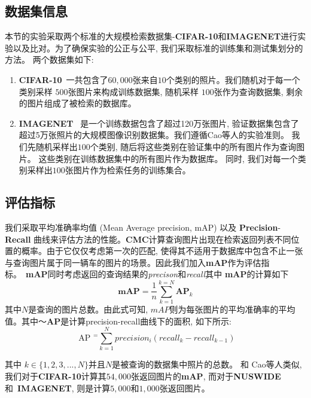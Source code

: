 \subsection{数据集信息}
本节的实验采取两个标准的大规模检索数据集-\textbf{CIFAR-10}和\textbf{IMAGENET}进行实验以及比对。为了确保实验的公正与公平, 我们采取标准的训练集和测试集划分的方法。 两个数据集如下:
\begin{enumerate}
    \item \textbf{CIFAR-10}~\cite{krizhevsky2009learning}一共包含了$60,000$张来自$10$个类别的照片。我们随机对于每一个类别采样 $500$张图片来构成训练数据集, 随机采样 $100$张作为查询数据集, 剩余的图片组成了被检索的数据库。 
    \item  \textbf{IMAGENET}~\cite{russakovsky2015imagenet} 是一个训练数据包含了超过120万张图片, 验证数据集包含了超过5万张照片的大规模图像识别数据集。我们遵循Cao等人的实验准则\cite{cao2017hashnet}。 我们先随机采样出$100$个类别, 随后将这些类别在验证集中的所有图片作为查询图片。 这些类别在训练数据集中的所有图片作为数据库。 同时, 我们对每一个类别采样出$100$张图片作为检索任务的训练集合。 
\end{enumerate}


\subsection{评估指标}
我们采取平均准确率均值 (Mean Average precision, mAP) 以及 \textbf{Precision}-\textbf{Recall}  曲线来评估方法的性能。\textbf{CMC}计算查询图片出现在检索返回列表不同位置的概率。由于它仅仅考虑第一次的匹配, 使得其不适用于数据库中包含不止一张与查询图片属于同一辆车的图片的场景。因此我们加入\textbf{mAP}作为评估指标。~\textbf{mAP}同时考虑返回的查询结果的\textit{precison}和\textit{recall}其中 \textbf{mAP}的计算如下
\begin{equation}
   \textbf{mAP} = \frac{1}{n} \sum_{k=1}^{k= N} \textbf{AP}_k
\end{equation}
其中$N$是查询的图片总数。由此式可知, $mAP$则为每张图片的平均准确率的平均值。其中～\textbf{AP}是计算precision-recall曲线下的面积, 如下所示:
\begin{equation}
  \text { AP }^{=} \sum_{k=1}^{N} precision _{i}\left( recall _{k}- recall _{k-1}\right)
\end{equation}

其中 $k \in \{1, 2, 3, ..., N\}$并且$N$是被查询的数据集中照片的总数。
和 Cao等人类似\cite{cao2018deep,cao2017hashnet}, 我们对于\textbf{CIFAR-10}计算其$54,000$张返回图片的\textbf{mAP}, 而对于\textbf{NUSWIDE}和~\textbf{IMAGENET}, 则是计算$5,000$和$1,000$张返回图片。
